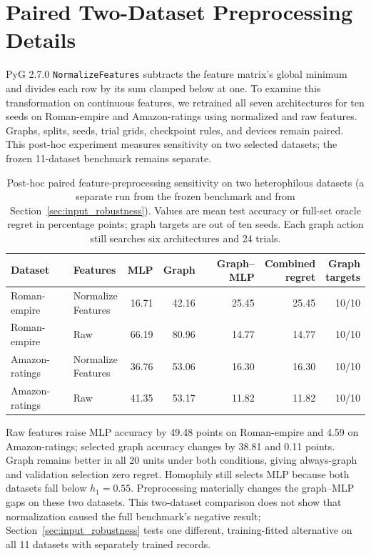 \section{Paired Two-Dataset Preprocessing Details}
\label{sec:preprocessing_sensitivity}

PyG 2.7.0 \texttt{NormalizeFeatures} subtracts the feature matrix's global minimum and divides each row by its sum clamped below at one. To examine this transformation on continuous features, we retrained all seven architectures for ten seeds on Roman-empire and Amazon-ratings using normalized and raw features. Graphs, splits, seeds, trial grids, checkpoint rules, and devices remain paired. This post-hoc experiment measures sensitivity on two selected datasets; the frozen 11-dataset benchmark remains separate.

\begin{table}[t]
\centering
\caption{Post-hoc paired feature-preprocessing sensitivity on two heterophilous datasets (a separate run from the frozen benchmark and from Section~\ref{sec:input_robustness}). Values are mean test accuracy or full-set oracle regret in percentage points; graph targets are out of ten seeds. Each graph action still searches six architectures and 24 trials.}
\label{tab:preprocessing_sensitivity}
\small
\setlength{\tabcolsep}{3.5pt}
\begin{tabular}{@{}llrrrrr@{}}
\toprule
Dataset & Features & MLP & Graph & Graph--MLP & \shortstack{Combined\\regret} & \shortstack{Graph\\targets} \\
\midrule
Roman-empire & \shortstack{Normalize\\Features} & 16.71 & 42.16 & 25.45 & 25.45 & 10/10 \\
Roman-empire & Raw & 66.19 & 80.96 & 14.77 & 14.77 & 10/10 \\
Amazon-ratings & \shortstack{Normalize\\Features} & 36.76 & 53.06 & 16.30 & 16.30 & 10/10 \\
Amazon-ratings & Raw & 41.35 & 53.17 & 11.82 & 11.82 & 10/10 \\
\bottomrule
\end{tabular}
\end{table}

Raw features raise MLP accuracy by 49.48 points on Roman-empire and 4.59 on Amazon-ratings; selected graph accuracy changes by 38.81 and 0.11 points. Graph remains better in all 20 units under both conditions, giving always-graph and validation selection zero regret. Homophily still selects MLP because both datasets fall below $h_1=0.55$. Preprocessing materially changes the graph--MLP gaps on these two datasets. This two-dataset comparison does not show that normalization caused the full benchmark's negative result; Section~\ref{sec:input_robustness} tests one different, training-fitted alternative on all 11 datasets with separately trained records.

